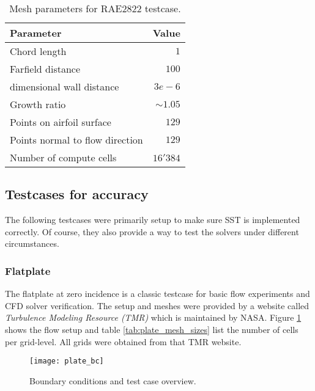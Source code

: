 \begin{table}[H]
    \centering
    \begin{tabular}{l r}
        \toprule
        Parameter                           & Value \\
        \midrule
        Chord length                        & $1$ \\
        Farfield distance                   & $100$ \\
        dimensional wall distance           & $3e-6$ \\
        Growth ratio                        & $\sim 1.05$ \\
        Points on airfoil surface           & $129$\\
        Points normal to flow direction     & $129$ \\
        Number of compute cells             & $16'384$\\
        \bottomrule
    \end{tabular}
    \caption{Mesh parameters for RAE2822 testcase.}
    \label{tab:mesh_parameters_rae2822}
\end{table}




\subsection{Testcases for accuracy}
The following testcases were primarily setup to make sure SST is implemented
correctly. Of course, they also provide a way to test the solvers under
different circumstances.


\subsubsection{Flatplate}
The flatplate at zero incidence is a classic testcase for basic flow
experiments and CFD solver verification. The setup and meshes were provided
by a website called \textit{Turbulence Modeling Resource (TMR)} which is
maintained by NASA. Figure \ref{fig:plate_bc} shows the flow setup and table
\ref{tab:plate_mesh_sizes} list the number of cells per grid-level. All grids
were obtained from that TMR website.

\begin{figure}[H] \centering
    \texttt{[image: plate\_bc]}
    \caption{Boundary conditions and test case overview. \cite{nasatmr}}
    \label{fig:plate_bc}
\end{figure}


